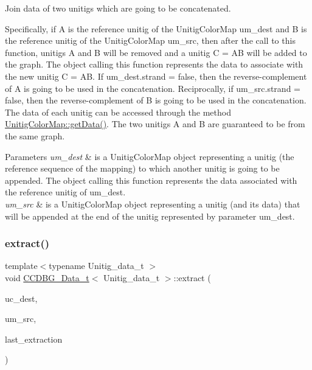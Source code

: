 Join data of two unitigs which are going to be concatenated. 

Specifically, if A is the reference unitig of the Unitig\+Color\+Map um\+\_\+dest and B is the reference unitig of the Unitig\+Color\+Map um\+\_\+src, then after the call to this function, unitigs A and B will be removed and a unitig C = AB will be added to the graph. The object calling this function represents the data to associate with the new unitig C = AB. If um\+\_\+dest.\+strand = false, then the reverse-\/complement of A is going to be used in the concatenation. Reciprocally, if um\+\_\+src.\+strand = false, then the reverse-\/complement of B is going to be used in the concatenation. The data of each unitig can be accessed through the method \hyperlink{classUnitigMap_a0c40fd1ba2df6af9a0c55b7963e41493}{Unitig\+Color\+Map\+::get\+Data()}. The two unitigs A and B are guaranteed to be from the same graph. 
\begin{DoxyParams}{Parameters}
{\em um\+\_\+dest} & is a Unitig\+Color\+Map object representing a unitig (the reference sequence of the mapping) to which another unitig is going to be appended. The object calling this function represents the data associated with the reference unitig of um\+\_\+dest. \\
\hline
{\em um\+\_\+src} & is a Unitig\+Color\+Map object representing a unitig (and its data) that will be appended at the end of the unitig represented by parameter um\+\_\+dest. \\
\hline
\end{DoxyParams}
\mbox{\label{classCCDBG__Data__t_a45794343781dc4e482537125f26ef61f}} 
\subsubsection{\texorpdfstring{extract()}{extract()}}
{\footnotesize\ttfamily template$<$typename Unitig\+\_\+data\+\_\+t $>$ \\
void \hyperlink{classCCDBG__Data__t}{C\+C\+D\+B\+G\+\_\+\+Data\+\_\+t}$<$ Unitig\+\_\+data\+\_\+t $>$\+::extract (\begin{DoxyParamCaption}\item[{const \hyperlink{classUnitigColors}{Unitig\+Colors} $\ast$}]{uc\+\_\+dest,  }\item[{const \hyperlink{classUnitigMap}{Unitig\+Color\+Map}$<$ U $>$ \&}]{um\+\_\+src,  }\item[{const bool}]{last\+\_\+extraction }\end{DoxyParamCaption})\hspace{0.3cm}{\ttfamily [inline]}}



